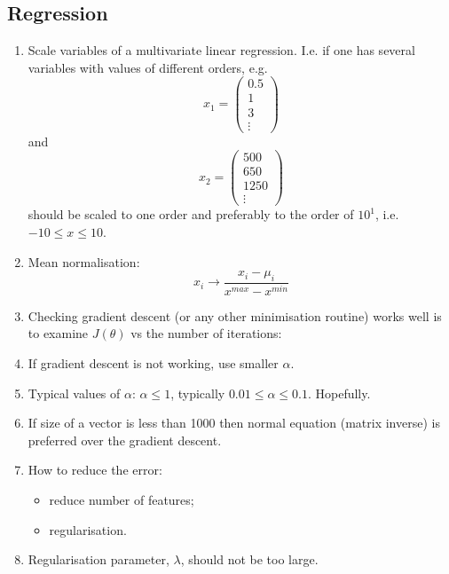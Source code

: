 \documentclass[a4paper,11pt]{article}
\begin{document}
\subsection{Regression}
\begin{enumerate}
\item Scale variables of a multivariate linear regression. I.e. if one has several variables with values of different orders, e.g.
\begin{equation}
x_1 = \left( \begin{array}{c}
0.5 \\
1 \\
3 \\
\vdots
\end{array} \right)
\end{equation}
and
\begin{equation}
x_2 = \left( \begin{array}{c}
500 \\
650 \\
1250 \\
\vdots
\end{array} \right)
\end{equation}
should be scaled to one order and preferably to the order of \textcolor{OliveGreen}{$10^1$}, i.e. \textcolor{OliveGreen}{$-10 \leq x \leq 10$}.
\item Mean normalisation:
\begin{equation}
x_i \rightarrow \frac{x_i - \mu_i}{x^{max} - x^{min}}
\end{equation}
\item Checking gradient descent (or any other minimisation routine) works well is to examine \textcolor{OliveGreen}{$J \left( \theta \right)$} vs the number of iterations:

\item If gradient descent is not working, use smaller \textcolor{OliveGreen}{$\alpha$}.
\item Typical values of \textcolor{OliveGreen}{$\alpha$}: \textcolor{OliveGreen}{$\alpha \leq 1$}, typically \textcolor{OliveGreen}{$0.01 \leq \alpha \leq 0.1$}. Hopefully.
\item If size of a vector is less than 1000 then normal equation (matrix inverse) is preferred over the gradient descent.
\item How to reduce the error:
\begin{itemize}
\item[--] reduce number of features;
\item[--] regularisation.
\end{itemize}
\item Regularisation parameter, \textcolor{OliveGreen}{$\lambda$}, should not be too large.
\end{enumerate}
\end{document}
